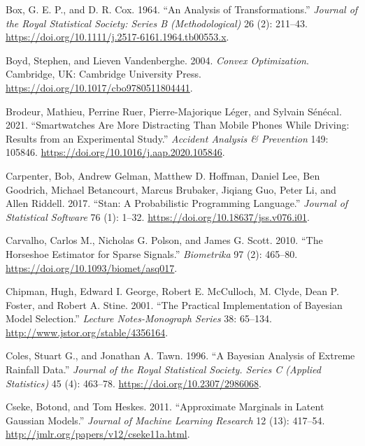 \documentclass[
  11pt,
  letterpaper,
]{scrbook}
\newlength{\cslhangindent}
\newenvironment{CSLReferences}[2] %
 {\begin{list}{}{%
  \setlength{\itemindent}{0pt}
  \setlength{\leftmargin}{0pt}
  \setlength{\parsep}{0pt}
  \ifodd #1
   \setlength{\leftmargin}{\cslhangindent}
   \setlength{\itemindent}{-1\cslhangindent}
  \fi
  \setlength{\itemsep}{#2\baselineskip}}}
 {\end{list}}
\theoremstyle{plain}
\theoremstyle{plain}
\theoremstyle{plain}
\theoremstyle{definition}
\theoremstyle{definition}
\theoremstyle{definition}
\theoremstyle{remark}
\begin{document}
\begin{CSLReferences}{1}{0}
Box, G. E. P., and D. R. Cox. 1964. {``An Analysis of
Transformations.''} \emph{Journal of the Royal Statistical Society:
Series B (Methodological)} 26 (2): 211--43.
\url{https://doi.org/10.1111/j.2517-6161.1964.tb00553.x}.

Boyd, Stephen, and Lieven Vandenberghe. 2004. \emph{Convex
Optimization}. Cambridge, UK: Cambridge University Press.
\url{https://doi.org/10.1017/cbo9780511804441}.

Brodeur, Mathieu, Perrine Ruer, Pierre-Majorique Léger, and Sylvain
Sénécal. 2021. {``Smartwatches Are More Distracting Than Mobile Phones
While Driving: Results from an Experimental Study.''} \emph{Accident
Analysis \& Prevention} 149: 105846.
\url{https://doi.org/10.1016/j.aap.2020.105846}.

Carpenter, Bob, Andrew Gelman, Matthew D. Hoffman, Daniel Lee, Ben
Goodrich, Michael Betancourt, Marcus Brubaker, Jiqiang Guo, Peter Li,
and Allen Riddell. 2017. {``{Stan}: A Probabilistic Programming
Language.''} \emph{Journal of Statistical Software} 76 (1): 1--32.
\url{https://doi.org/10.18637/jss.v076.i01}.

Carvalho, Carlos M., Nicholas G. Polson, and James G. Scott. 2010.
{``The Horseshoe Estimator for Sparse Signals.''} \emph{Biometrika} 97
(2): 465--80. \url{https://doi.org/10.1093/biomet/asq017}.

Chipman, Hugh, Edward I. George, Robert E. McCulloch, M. Clyde, Dean P.
Foster, and Robert A. Stine. 2001. {``The Practical Implementation of
{B}ayesian Model Selection.''} \emph{Lecture Notes-Monograph Series} 38:
65--134. \url{http://www.jstor.org/stable/4356164}.

Coles, Stuart G., and Jonathan A. Tawn. 1996. {``A {B}ayesian Analysis
of Extreme Rainfall Data.''} \emph{Journal of the Royal Statistical
Society. Series C (Applied Statistics)} 45 (4): 463--78.
\url{https://doi.org/10.2307/2986068}.

Cseke, Botond, and Tom Heskes. 2011. {``Approximate Marginals in Latent
{G}aussian Models.''} \emph{Journal of Machine Learning Research} 12
(13): 417--54. \url{http://jmlr.org/papers/v12/cseke11a.html}.


\end{CSLReferences}
\end{document}
